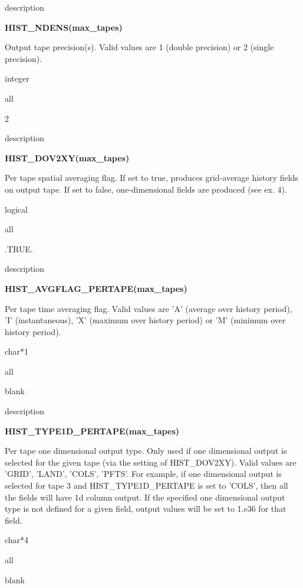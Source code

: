 \begin{Ventry}{description}
 \item[{\bf name}] {\bf HIST\_NDENS(max\_tapes)}   
 \item[description] Output tape precision(s). 
	Valid values are 1 (double precision) or 2 (single precision). 
 \item[type] integer    
 \item[mode] all   
 \item[default] 2                                                              
\end{Ventry}
\medskip

\begin{Ventry}{description}
 \item[{\bf name}] {\bf HIST\_DOV2XY(max\_tapes)}   
 \item[description] 
	Per tape spatial averaging flag.  If set to true, produces
	grid-average history fields on output tape. If set to false,
	one-dimensional fields are produced (see ex. 4).
 \item[type] logical    
 \item[mode] all    
 \item[default] .TRUE.  
\end{Ventry}
\medskip

\begin{Ventry}{description}
 \item[{\bf name}] {\bf HIST\_AVGFLAG\_PERTAPE(max\_tapes)}   
 \item[description] Per tape time averaging flag. 
	Valid values are 'A' (average over history period), 'I' (instantaneous), 
	'X' (maximum over history period) or 'M' (minimum over history period). 
 \item[type] char*1
 \item[mode] all    
 \item[default] blank
\end{Ventry}
\medskip

\begin{Ventry}{description}
 \item[{\bf name}] {\bf HIST\_TYPE1D\_PERTAPE(max\_tapes)}   
 \item[description] 
	Per tape one dimensional output type. 
	Only used if one dimensional output is selected for the given tape 
	(via the setting of HIST\_DOV2XY). 
	Valid values are 'GRID', 'LAND', 'COLS', 'PFTS'.
	For example, if one dimensional output is selected for tape 3 and 
	HIST\_TYPE1D\_PERTAPE is set to 'COLS', then all the fields will have 1d 
	column output. If the specified one dimensional output type
	is not defined for a given field, output values will be set to 1.e36 
	for that field.
 \item[type] char*4
 \item[mode] all    
 \item[default] blank
\end{Ventry}
\medskip


